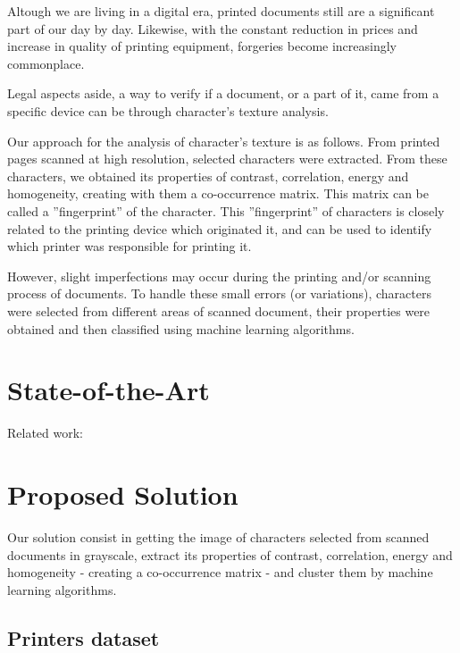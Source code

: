 \documentclass[10pt,twocolumn,letterpaper]{article}
\begin{document}
Altough we are living in a digital era, printed documents still are a significant part of our day by day. Likewise, with the constant reduction in prices and increase in quality of printing equipment, forgeries become increasingly commonplace.

Legal aspects aside, a way to verify if a document, or a part of it, came from a specific device can be through  character's texture analysis.

Our approach for the analysis of character's texture is as follows. From printed pages scanned at high resolution, selected characters were extracted. From these characters, we obtained its properties of contrast, correlation, energy and homogeneity, creating with them a co-occurrence matrix. This matrix can be called a ''fingerprint'' of the character. This ''fingerprint'' of  characters is closely related to the printing device which originated it, and can be used to identify which printer was responsible for printing it.

However, slight imperfections may occur during the printing and/or scanning process of documents. To handle these small errors (or variations), characters were selected from different areas of scanned document, their properties were obtained and then classified using machine learning algorithms.

\section{State-of-the-Art}
\label{sec:state_of_the_art}

Related work: \cite{Bulan}

\section{Proposed Solution}
\label{sec:proposed_solution}

Our solution consist in getting the image of characters selected from scanned documents in grayscale, extract its properties of contrast, correlation, energy and homogeneity - creating a co-occurrence matrix - and cluster them by machine learning algorithms.

\subsection{Printers dataset}
\label{subsec:printers_dataset}
\end{document}
